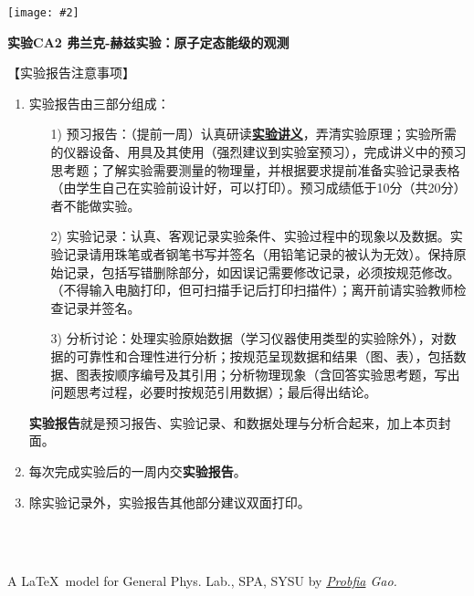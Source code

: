 \documentclass[11pt,a4paper]{ctexart}
\newcommand{\ExpeName}{实验CA2 弗兰克-赫兹实验：原子定态能级的观测}
\newcommand{\cpic}[2]{
\begin{center}
\texttt{[image: \#2]}
\end{center}
}
\begin{document}
\cpic{0.255}{e1}%
\begin{center}
\LARGE\textbf{{\ExpeName}}
\end{center}
\large{【实验报告注意事项】}
\begin{enumerate}
 \item 实验报告由三部分组成：
 \begin{enumerate}
  \item[1)]预习报告：（提前一周）认真研读\textbf{\uline{实验讲义}}，弄清实验原理；实验所需的仪器设备、用具及其使用（强烈建议到实验室预习），完成讲义中的预习思考题；了解实验需要测量的物理量，并根据要求提前准备实验记录表格（由学生自己在实验前设计好，可以打印）。预习成绩低于10分（共20分）者不能做实验。
  \item[2)]实验记录：认真、客观记录实验条件、实验过程中的现象以及数据。实验记录请用珠笔或者钢笔书写并签名（{\color{red}用铅笔记录的被认为无效}）。{\color{red}保持原始记录，包括写错删除部分，如因误记需要修改记录，必须按规范修改。}（不得输入电脑打印，但可扫描手记后打印扫描件）；离开前请实验教师检查记录并签名。
  \item[3)]分析讨论：处理实验原始数据（学习仪器使用类型的实验除外），对数据的可靠性和合理性进行分析；按规范呈现数据和结果（图、表），包括数据、图表按顺序编号及其引用；分析物理现象（含回答实验思考题，写出问题思考过程，必要时按规范引用数据）；最后得出结论。
 \end{enumerate}
 \textbf{实验报告}就是预习报告、实验记录、和数据处理与分析合起来，加上本页封面。
 \item 每次完成实验后的一周内交\textbf{实验报告}。
 \item 除实验记录外，实验报告其他部分建议双面打印。
\end{enumerate}
\ 
\\
\ 

\begin{flushright}                                                           %
\tiny{
A \LaTeX \ model for General Phys. Lab., SPA, SYSU by \em{\href{https://www.weibo.com/3532532974/profile?rightmod=1&wvr=6&mod=personinfo&is_all=1}{Probfia} Gao.}
}
\end{flushright}
\end{document}
